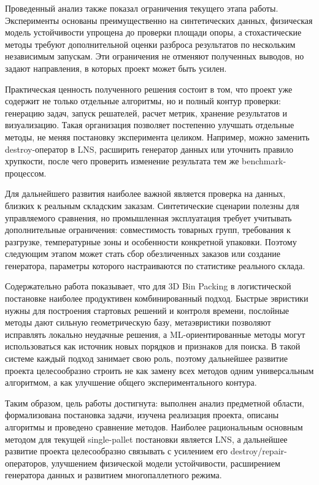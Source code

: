 Проведенный анализ также показал ограничения текущего этапа работы. Эксперименты основаны преимущественно на синтетических данных, физическая модель устойчивости упрощена до проверки площади опоры, а стохастические методы требуют дополнительной оценки разброса результатов по нескольким независимым запускам. Эти ограничения не отменяют полученных выводов, но задают направления, в которых проект может быть усилен.

Практическая ценность полученного решения состоит в том, что проект уже содержит не только отдельные алгоритмы, но и полный контур проверки: генерацию задач, запуск решателей, расчет метрик, хранение результатов и визуализацию. Такая организация позволяет постепенно улучшать отдельные методы, не меняя постановку эксперимента целиком. Например, можно заменить destroy-оператор в LNS, расширить генератор данных или уточнить правило хрупкости, после чего проверить изменение результата тем же benchmark-процессом.

Для дальнейшего развития наиболее важной является проверка на данных, близких к реальным складским заказам. Синтетические сценарии полезны для управляемого сравнения, но промышленная эксплуатация требует учитывать дополнительные ограничения: совместимость товарных групп, требования к разгрузке, температурные зоны и особенности конкретной упаковки. Поэтому следующим этапом может стать сбор обезличенных заказов или создание генератора, параметры которого настраиваются по статистике реального склада.

Содержательно работа показывает, что для 3D Bin Packing в логистической постановке наиболее продуктивен комбинированный подход. Быстрые эвристики нужны для построения стартовых решений и контроля времени, послойные методы дают сильную геометрическую базу, метаэвристики позволяют исправлять локально неудачные решения, а ML-ориентированные методы могут использоваться как источник новых порядков и признаков для поиска. В такой системе каждый подход занимает свою роль, поэтому дальнейшее развитие проекта целесообразно строить не как замену всех методов одним универсальным алгоритмом, а как улучшение общего экспериментального контура.

Таким образом, цель работы достигнута: выполнен анализ предметной области, формализована постановка задачи, изучена реализация проекта, описаны алгоритмы и проведено сравнение методов. Наиболее рациональным основным методом для текущей single-pallet постановки является LNS, а дальнейшее развитие проекта целесообразно связывать с усилением его destroy/repair-операторов, улучшением физической модели устойчивости, расширением генератора данных и развитием многопаллетного режима.
